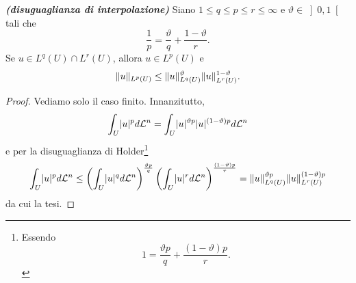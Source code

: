 \begin{teorema}\emph{\textbf{(disuguaglianza di interpolazione)}}
Siano $1 \le q \le p \le r \le \infty$ e $\vartheta \in \left] 0,1\right[ $ tali che 
\[ \frac{1}{p} = \frac{\vartheta}{q} + \frac{1-\vartheta}{r}.  \]
Se $u \in L^q(U)\cap L^r(U)$, allora $u \in L^p(U)$ e 
\[ \lVert u\rVert_{L^p(U)} \le \lVert u\rVert_{L^q(U)}^\vartheta\lVert u\rVert_{L^r(U)}^{1-\vartheta}.\]

\begin{proof}
Vediamo solo il caso finito. Innanzitutto,
\[ \int_{U} \lvert u\rvert^pd\mathcal{L}^n = \int_{U} \lvert u\rvert^{\vartheta p}\lvert u\rvert^{(1-\vartheta)p}d\mathcal{L}^n  \]
e per la disuguaglianza di Holder\footnote{Essendo \[ 1 = \frac{\vartheta p}{q} + \frac{(1-\vartheta)p}{r}.  \]}
\[ \int_{U} \lvert u\rvert^pd\mathcal{L}^n \le \left( \int_{U}\lvert u\rvert^{q}d\mathcal{L}^n\right) ^{\frac{\vartheta p}{q}} \left( \int_{U}\lvert u\rvert^rd\mathcal{L}^n\right)^{\frac{(1 -\vartheta) p}{r}} = \lVert u\rVert_{L^q(U)}^{\vartheta p}  \lVert u\rVert_{L^r(U)}^{(1- \vartheta) p} \]
da cui la tesi.
\end{proof}
\end{teorema}
